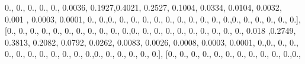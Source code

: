 \documentclass[
]{book}
\newenvironment{Shaded}{\begin{snugshade}}{\end{snugshade}}
\newcommand{\FloatTok}[1]{\textcolor[rgb]{0.00,0.00,0.81}{#1}}
\newcommand{\NormalTok}[1]{#1}
\begin{document}
\begin{Shaded}
\begin{Highlighting}[]
\FloatTok{0.}\NormalTok{, }\FloatTok{0.}\NormalTok{, }\FloatTok{0.}\NormalTok{, }\FloatTok{0.}\NormalTok{, }\FloatTok{0.}\NormalTok{, }\FloatTok{0.0036}\NormalTok{, }\FloatTok{0.1927}\NormalTok{,}\FloatTok{0.4021}\NormalTok{, }\FloatTok{0.2527}\NormalTok{, }\FloatTok{0.1004}\NormalTok{, }\FloatTok{0.0334}\NormalTok{, }\FloatTok{0.0104}\NormalTok{,}
\FloatTok{0.0032}\NormalTok{, }\FloatTok{0.001}\NormalTok{ , }\FloatTok{0.0003}\NormalTok{, }\FloatTok{0.0001}\NormalTok{, }\FloatTok{0.}\NormalTok{, }\FloatTok{0.}\NormalTok{,}\FloatTok{0.}\NormalTok{, }\FloatTok{0.}\NormalTok{, }\FloatTok{0.}\NormalTok{, }\FloatTok{0.}\NormalTok{, }\FloatTok{0.}\NormalTok{, }\FloatTok{0.}\NormalTok{, }\FloatTok{0.}\NormalTok{, }\FloatTok{0.}\NormalTok{, }\FloatTok{0.}\NormalTok{, }\FloatTok{0.}\NormalTok{,}
\FloatTok{0.}\NormalTok{,}\FloatTok{0.}\NormalTok{, }\FloatTok{0.}\NormalTok{, }\FloatTok{0.}\NormalTok{, }\FloatTok{0.}\NormalTok{, }\FloatTok{0.}\NormalTok{, }\FloatTok{0.}\NormalTok{], [}\FloatTok{0.}\NormalTok{, }\FloatTok{0.}\NormalTok{, }\FloatTok{0.}\NormalTok{, }\FloatTok{0.}\NormalTok{, }\FloatTok{0.}\NormalTok{, }\FloatTok{0.}\NormalTok{, }\FloatTok{0.}\NormalTok{, }\FloatTok{0.}\NormalTok{, }\FloatTok{0.}\NormalTok{, }\FloatTok{0.}\NormalTok{, }\FloatTok{0.}\NormalTok{,}\FloatTok{0.}\NormalTok{, }\FloatTok{0.}\NormalTok{,}
\FloatTok{0.}\NormalTok{, }\FloatTok{0.}\NormalTok{, }\FloatTok{0.}\NormalTok{, }\FloatTok{0.}\NormalTok{, }\FloatTok{0.}\NormalTok{, }\FloatTok{0.}\NormalTok{, }\FloatTok{0.}\NormalTok{, }\FloatTok{0.}\NormalTok{, }\FloatTok{0.018}\NormalTok{ ,}\FloatTok{0.2749}\NormalTok{, }\FloatTok{0.3813}\NormalTok{, }\FloatTok{0.2082}\NormalTok{, }\FloatTok{0.0792}\NormalTok{, }\FloatTok{0.0262}\NormalTok{,}
\FloatTok{0.0083}\NormalTok{, }\FloatTok{0.0026}\NormalTok{, }\FloatTok{0.0008}\NormalTok{, }\FloatTok{0.0003}\NormalTok{, }\FloatTok{0.0001}\NormalTok{, }\FloatTok{0.}\NormalTok{,}\FloatTok{0.}\NormalTok{, }\FloatTok{0.}\NormalTok{, }\FloatTok{0.}\NormalTok{, }\FloatTok{0.}\NormalTok{, }\FloatTok{0.}\NormalTok{, }\FloatTok{0.}\NormalTok{, }\FloatTok{0.}\NormalTok{, }\FloatTok{0.}\NormalTok{, }\FloatTok{0.}\NormalTok{,}
\FloatTok{0.}\NormalTok{, }\FloatTok{0.}\NormalTok{,}\FloatTok{0.}\NormalTok{, }\FloatTok{0.}\NormalTok{, }\FloatTok{0.}\NormalTok{, }\FloatTok{0.}\NormalTok{, }\FloatTok{0.}\NormalTok{, }\FloatTok{0.}\NormalTok{], [}\FloatTok{0.}\NormalTok{, }\FloatTok{0.}\NormalTok{, }\FloatTok{0.}\NormalTok{, }\FloatTok{0.}\NormalTok{, }\FloatTok{0.}\NormalTok{, }\FloatTok{0.}\NormalTok{, }\FloatTok{0.}\NormalTok{, }\FloatTok{0.}\NormalTok{, }\FloatTok{0.}\NormalTok{, }\FloatTok{0.}\NormalTok{, }\FloatTok{0.}\NormalTok{,}\FloatTok{0.}\NormalTok{,}

\end{Highlighting}
\end{Shaded}
\end{document}
